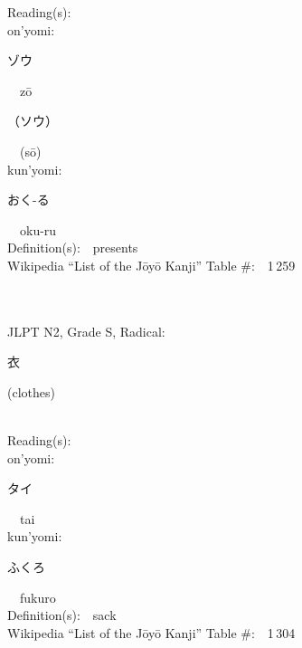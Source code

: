 \begin{multicols}{2}
Reading(s):\ \ \\
{\hspace*{1em}}on'yomi:\ \ \\
{\hspace*{2em}}{\begin{CJK}{UTF8}{min} ゾウ \end{CJK}}\ \ z\=o\ \ \\
{\hspace*{2em}}{\begin{CJK}{UTF8}{min} （ソウ） \end{CJK}}\ \ (s\=o)\ \ \\
{\hspace*{1em}}kun'yomi:\ \ \\
{\hspace*{2em}}{\begin{CJK}{UTF8}{min} おく-る \end{CJK}}\ \ oku-ru\ \ \\
Definition(s):\ \ presents \\
Wikipedia ``List of the J\=oy\=o Kanji'' Table \#:\ \ 1\,259 \\
\ \ \\
{\fontsize{34pt}{40pt}  }\ \ \\  %
{JLPT N2, Grade S, Radical:\ \ {\begin{CJK}{UTF8}{min} 衣 \end{CJK}} (clothes) } \\
Reading(s):\ \ \\
{\hspace*{1em}}on'yomi:\ \ \\
{\hspace*{2em}}{\begin{CJK}{UTF8}{min} タイ \end{CJK}}\ \ tai\ \ \\
{\hspace*{1em}}kun'yomi:\ \ \\
{\hspace*{2em}}{\begin{CJK}{UTF8}{min} ふくろ \end{CJK}}\ \ fukuro\ \ \\
Definition(s):\ \ sack \\
Wikipedia ``List of the J\=oy\=o Kanji'' Table \#:\ \ 1\,304 \\
\ \ \\

\end{multicols}

